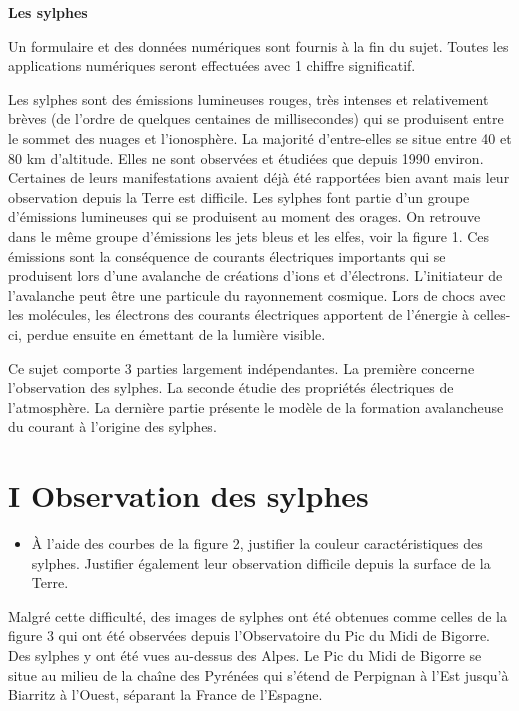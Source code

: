 \begin{center}
\Large \textbf{Les sylphes}
\end{center}

Un formulaire et des données numériques sont fournis à la fin du sujet.
Toutes les applications numériques seront effectuées avec 1 chiffre significatif.

Les sylphes sont des émissions lumineuses rouges, très intenses et relativement brèves (de l'ordre de quelques centaines de millisecondes) qui se produisent entre le sommet des nuages et l'ionosphère. La majorité d'entre-elles se situe entre 40 et 80 km d'altitude. Elles ne sont observées et étudiées que depuis 1990 environ. Certaines de leurs manifestations avaient déjà été rapportées bien avant mais leur observation depuis la Terre est difficile. Les sylphes font partie d'un groupe d'émissions lumineuses qui se produisent au moment des orages. On retrouve dans le même groupe d'émissions les jets bleus et les elfes, voir la figure 1. Ces émissions sont la conséquence de courants électriques importants qui se produisent lors d'une avalanche de créations d'ions et d'électrons. L'initiateur de l'avalanche peut être une particule du rayonnement cosmique. Lors de chocs avec les molécules, les électrons des courants électriques apportent de l'énergie à celles-ci, perdue ensuite en émettant de la lumière visible.


Ce sujet comporte 3 parties largement indépendantes. La première concerne l'observation des sylphes. La seconde étudie des propriétés électriques de l'atmosphère. La dernière partie présente le modèle de la formation avalancheuse du courant à l'origine des sylphes.

\section*{I Observation des sylphes}

\begin{itemize}
    \item[$\square$ -- 1.] À l'aide des courbes de la figure 2, justifier la couleur caractéristiques des sylphes. Justifier également leur observation difficile depuis la surface de la Terre.
\end{itemize}

Malgré cette difficulté, des images de sylphes ont été obtenues comme celles de la figure 3 qui ont été observées depuis l'Observatoire du Pic du Midi de Bigorre. Des sylphes y ont été vues au-dessus des Alpes. Le Pic du Midi de Bigorre se situe au milieu de la chaîne des Pyrénées qui s'étend de Perpignan à l'Est jusqu'à Biarritz à l'Ouest, séparant la France de l'Espagne.
